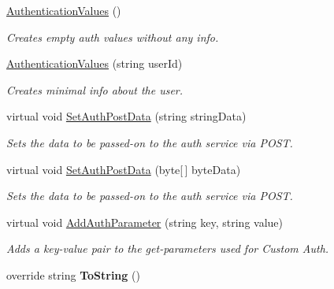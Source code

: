 \begin{DoxyCompactItemize}
\item 
\hyperlink{class_exit_games_1_1_client_1_1_photon_1_1_chat_1_1_authentication_values_aa1a218337b71411767e9d5ef7740bf02}{Authentication\+Values} ()
\begin{DoxyCompactList}\small\item\em Creates empty auth values without any info.\end{DoxyCompactList}\item 
\hyperlink{class_exit_games_1_1_client_1_1_photon_1_1_chat_1_1_authentication_values_a731ad99cd27c9c9943ebae6e7aade2e2}{Authentication\+Values} (string user\+Id)
\begin{DoxyCompactList}\small\item\em Creates minimal info about the user. \end{DoxyCompactList}\item 
virtual void \hyperlink{class_exit_games_1_1_client_1_1_photon_1_1_chat_1_1_authentication_values_a2b0231eb3737127f6c905fca3bda5976}{Set\+Auth\+Post\+Data} (string string\+Data)
\begin{DoxyCompactList}\small\item\em Sets the data to be passed-\/on to the auth service via P\+O\+ST. \end{DoxyCompactList}\item 
virtual void \hyperlink{class_exit_games_1_1_client_1_1_photon_1_1_chat_1_1_authentication_values_a551321f83ae6ae95688ebfa99251daf4}{Set\+Auth\+Post\+Data} (byte\mbox{[}$\,$\mbox{]} byte\+Data)
\begin{DoxyCompactList}\small\item\em Sets the data to be passed-\/on to the auth service via P\+O\+ST. \end{DoxyCompactList}\item 
virtual void \hyperlink{class_exit_games_1_1_client_1_1_photon_1_1_chat_1_1_authentication_values_ad82074fee0c1ef809978e612dd882405}{Add\+Auth\+Parameter} (string key, string value)
\begin{DoxyCompactList}\small\item\em Adds a key-\/value pair to the get-\/parameters used for Custom Auth. \end{DoxyCompactList}\item 
override string {\bfseries To\+String} ()\hypertarget{class_exit_games_1_1_client_1_1_photon_1_1_chat_1_1_authentication_values_a083a5547fef3709586481254c256e04e}{}\label{class_exit_games_1_1_client_1_1_photon_1_1_chat_1_1_authentication_values_a083a5547fef3709586481254c256e04e}

\end{DoxyCompactItemize}

